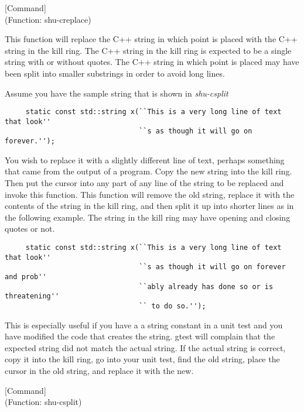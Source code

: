 \vspace{1em}
\noindent
{}
\usebox{\funcname}
 \hfill [Command]\\%
 (Function: shu-creplace)

\begin{doc-string}
This function will replace the C++ string in which point is placed with the
C++ string in the kill ring.  The C++ string in the kill ring is expected to be
a single string with or without quotes.  The C++ string in which point is placed
may have been split into smaller substrings in order to avoid long lines.

Assume you have the sample string that is shown in \emph{shu-csplit}

\small{\begin{verbatim}
     static const std::string x(``This is a very long line of text that look''
                                ``s as though it will go on forever.'');
\end{verbatim}}

You wish to replace it with a slightly different line of text, perhaps something
that came from the output of a program.  Copy the new string into the kill ring.
Then put the cursor into any part of any line of the string to be replaced
and invoke this function.  This function will remove the old string, replace it
with the contents of the string in the kill ring, and then split it up into
shorter lines as in the following example.  The string in the kill ring may have
opening and closing quotes or not.

\small{\begin{verbatim}
     static const std::string x(``This is a very long line of text that look''
                                ``s as though it will go on forever and prob''
                                ``ably already has done so or is threatening''
                                `` to do so.'');
\end{verbatim}}

This is especially useful if you have a a string constant in a unit test and you
have modified the code that creates the string.  gtest will complain that the
expected string did not match the actual string.  If the actual string is
correct, copy it into the kill ring, go into your unit test, find the old
string, place the cursor in the old string, and replace it with the new.
\end{doc-string}

\vspace{1em}
\noindent
{}
\usebox{\funcname}
 \hfill [Command]\\%
 (Function: shu-csplit)

